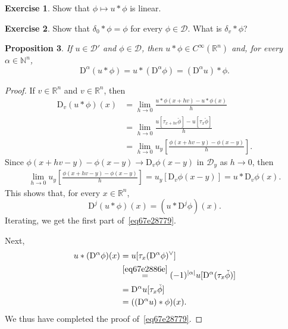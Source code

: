 \documentclass[a4paper,9pt]{amsart}
\newcommand{\scr}[1]{\mathscr{#1}}
\newcommand{\N}{\mathbb{N}}	%
\newcommand{\R}{\mathbb{R}}	%
\newcommand{\Diff}{\mathrm{D}}
\theoremstyle{plain}
\newtheorem{proposition}{Proposition}[section]
\theoremstyle{definition}
\newtheorem{exercise}[proposition]{Exercise}%
\theoremstyle{remark}
\begin{document}
\begin{exercise}
	Show that $\phi\mapsto u*\phi$ is linear.
\end{exercise}

\begin{exercise}
	Show that $\delta_0*\phi = \phi$ for every $\phi\in\scr D$.
	What is $\delta_v*\phi$?
\end{exercise}

\begin{proposition}\label{prop67ea5631}
	If $u\in\scr D'$ and $\phi\in\scr D$, then
	$u*\phi\in C^\infty(\R^n)$ and, for every $\alpha\in\N^n$,
	\begin{equation}\label{eq67e28779}
		\Diff^\alpha(u*\phi) = u*(\Diff^\alpha \phi) = (\Diff^\alpha u)*\phi .
	\end{equation}
\end{proposition}
\begin{proof}
	If $v\in\R^n$ and $v\in\R^n$, then
	\begin{align*}
	\Diff_v(u*\phi)(x)
	&= \lim_{h\to0} \frac{u*\phi(x+hv) - u*\phi(x)}{h} \\
	&= \lim_{h\to0} \frac{u[\tau_{x+hv}\check\phi] - u[\tau_x\check\phi]}{h} \\
	&= \lim_{h\to0} u_y\left[ \frac{ \phi(x+hv-y) - \phi(x-y) }{ h } \right] .
	\end{align*}
	Since $\phi(x+hv-y) - \phi(x-y)\to \Diff_v\phi(x-y)$ in $\scr D_y$ as $h\to0$, then 
	\begin{align*}
	\lim_{h\to0} u_y\left[ \frac{ \phi(x+hv-y) - \phi(x-y) }{ h } \right]
	= u_y[\Diff_v\phi(x-y)] 
	= u*\Diff_v\phi(x) .
	\end{align*}
	This shows that, for every $x\in\R^n$,
	\begin{equation}
		\Diff^j(u*\phi)(x) = (u*\Diff^j\phi)(x) .
	\end{equation}
	Iterating, we get the first part of~\eqref{eq67e28779}.
	
	Next, 
	\begin{align*}
	 	u*(\Diff^\alpha \phi)(x)
		&= u[\tau_x (\Diff^\alpha \phi)^\vee ]\\
		&\overset{\eqref{eq67e2886e}}= (-1)^{|\alpha|} u[\Diff^\alpha(\tau_x\check\phi)]\\
		&= \Diff^\alpha u[\tau_x\check\phi] \\
		&= ((\Diff^\alpha u)*\phi)(x) .
	\end{align*}
	We thus have completed the proof of~\eqref{eq67e28779}.
\end{proof}
\end{document}
